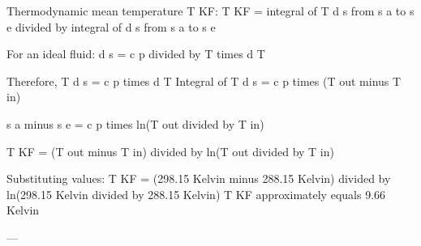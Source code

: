 Thermodynamic mean temperature T KF:  
T KF = integral of T d s from s a to s e divided by integral of d s from s a to s e  

For an ideal fluid:  
d s = c p divided by T times d T  

Therefore,  
T d s = c p times d T  
Integral of T d s = c p times (T out minus T in)  

s a minus s e = c p times ln(T out divided by T in)  

T KF = (T out minus T in) divided by ln(T out divided by T in)  

Substituting values:  
T KF = (298.15 Kelvin minus 288.15 Kelvin) divided by ln(298.15 Kelvin divided by 288.15 Kelvin)  
T KF approximately equals 9.66 Kelvin  

---